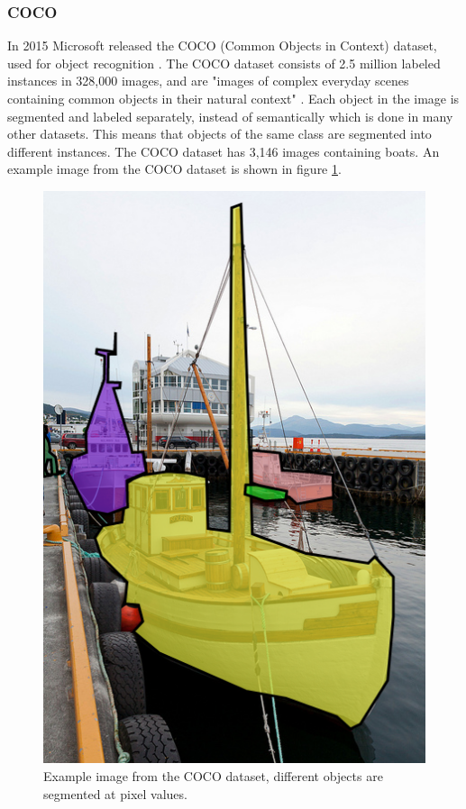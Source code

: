 \clearpage

\subsubsection{COCO}
In 2015 Microsoft released the COCO (Common Objects in Context) dataset, used for object recognition \citep{Lin2014}. The COCO dataset consists of 2.5 million labeled instances in 328,000 images, and are "images of complex everyday scenes containing common objects in their natural context" \citep{Lin2014}. Each object in the image is segmented and labeled separately, instead of semantically which is done in many other datasets. This means that objects of the same class are segmented into different instances. The COCO dataset has 3,146 images containing boats. An example image from the COCO dataset is shown in figure \ref{fig:coco}.

\begin{figure}[h!]
    \centering
    \includegraphics[scale=0.4]{images/coco.png}
    \caption{Example image from the COCO dataset, different objects are segmented at pixel values.}
    \label{fig:coco}
\end{figure}

